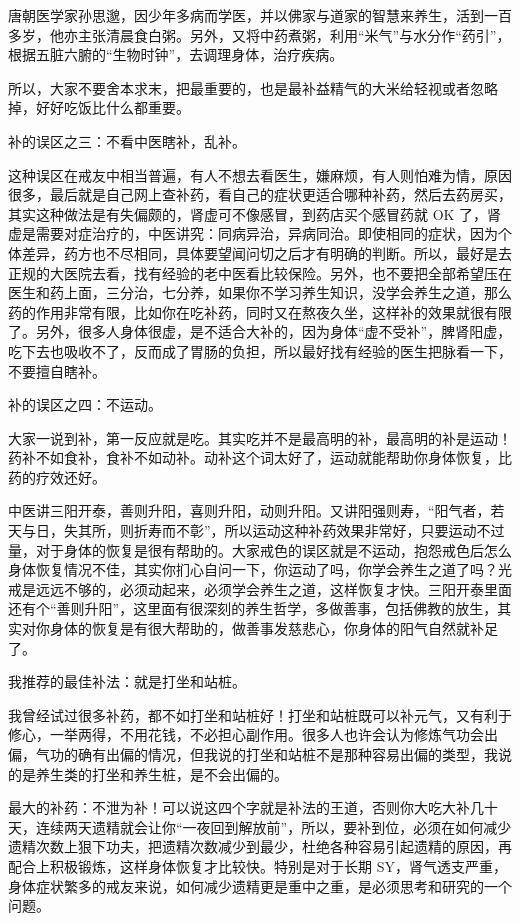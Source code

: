 \documentclass[fontset=founder]{ctexart}
\begin{document}
唐朝医学家孙思邈，因少年多病而学医，并以佛家与道家的智慧来养生，活到一百多岁，他亦主张清晨食白粥。另外，又将中药煮粥，利用“米气”与水分作“药引”，根据五脏六腑的“生物时钟”，去调理身体，治疗疾病。

所以，大家不要舍本求末，把最重要的，也是最补益精气的大米给轻视或者忽略掉，好好吃饭比什么都重要。

补的误区之三：不看中医瞎补，乱补。

这种误区在戒友中相当普遍，有人不想去看医生，嫌麻烦，有人则怕难为情，原因很多，最后就是自己网上查补药，看自己的症状更适合哪种补药，然后去药房买，其实这种做法是有失偏颇的，肾虚可不像感冒，到药店买个感冒药就 OK 了，肾虚是需要对症治疗的，中医讲究：同病异治，异病同治。即使相同的症状，因为个体差异，药方也不尽相同，具体要望闻问切之后才有明确的判断。所以，最好是去正规的大医院去看，找有经验的老中医看比较保险。另外，也不要把全部希望压在医生和药上面，三分治，七分养，如果你不学习养生知识，没学会养生之道，那么药的作用非常有限，比如你在吃补药，同时又在熬夜久坐，这样补的效果就很有限了。另外，很多人身体很虚，是不适合大补的，因为身体“虚不受补”，脾肾阳虚，吃下去也吸收不了，反而成了胃肠的负担，所以最好找有经验的医生把脉看一下，不要擅自瞎补。

补的误区之四：不运动。

大家一说到补，第一反应就是吃。其实吃并不是最高明的补，最高明的补是运动！药补不如食补，食补不如动补。动补这个词太好了，运动就能帮助你身体恢复，比药的疗效还好。

中医讲三阳开泰，善则升阳，喜则升阳，动则升阳。又讲阳强则寿，“阳气者，若天与日，失其所，则折寿而不彰”，所以运动这种补药效果非常好，只要运动不过量，对于身体的恢复是很有帮助的。大家戒色的误区就是不运动，抱怨戒色后怎么身体恢复情况不佳，其实你扪心自问一下，你运动了吗，你学会养生之道了吗？光戒是远远不够的，必须动起来，必须学会养生之道，这样恢复才快。三阳开泰里面还有个“善则升阳”，这里面有很深刻的养生哲学，多做善事，包括佛教的放生，其实对你身体的恢复是有很大帮助的，做善事发慈悲心，你身体的阳气自然就补足了。

我推荐的最佳补法：就是打坐和站桩。

我曾经试过很多补药，都不如打坐和站桩好！打坐和站桩既可以补元气，又有利于修心，一举两得，不用花钱，不必担心副作用。很多人也许会认为修炼气功会出偏，气功的确有出偏的情况，但我说的打坐和站桩不是那种容易出偏的类型，我说的是养生类的打坐和养生桩，是不会出偏的。

最大的补药：不泄为补！可以说这四个字就是补法的王道，否则你大吃大补几十天，连续两天遗精就会让你“一夜回到解放前”，所以，要补到位，必须在如何减少遗精次数上狠下功夫，把遗精次数减少到最少，杜绝各种容易引起遗精的原因，再配合上积极锻炼，这样身体恢复才比较快。特别是对于长期 SY，肾气透支严重，身体症状繁多的戒友来说，如何减少遗精更是重中之重，是必须思考和研究的一个问题。
\end{document}
